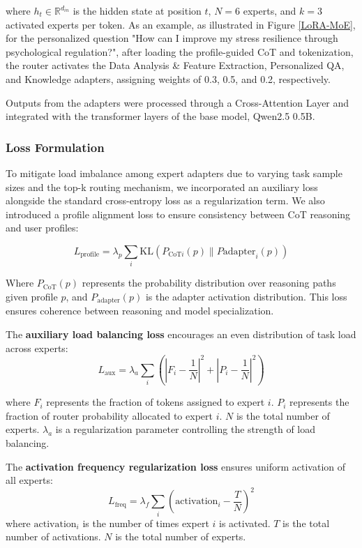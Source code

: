 \documentclass[preprint,12pt]{elsarticle}
\begin{document}
\noindent where $h_t \in \mathbb{R}^{d_{in}}$ is the hidden state at position $t$, $N = 6$ experts, and $k = 3$ activated experts per token. As an example, as illustrated in Figure \ref{LoRA-MoE}, for the personalized question "How can I improve my stress resilience through psychological regulation?", after loading the profile-guided CoT and tokenization, the router activates the Data Analysis \& Feature Extraction, Personalized QA, and Knowledge adapters, assigning weights of 0.3, 0.5, and 0.2, respectively.

Outputs from the adapters were processed through a Cross-Attention Layer and integrated with the transformer layers of the base model, Qwen2.5 0.5B.

\subsubsection{Loss Formulation}
To mitigate load imbalance among expert adapters due to varying task sample sizes and the top-k routing mechanism, we incorporated an auxiliary loss alongside the standard cross-entropy loss as a regularization term. We also introduced a profile alignment loss to ensure consistency between CoT reasoning and user profiles:

\begin{equation}
L_{\text{profile}} = \lambda_p \sum_{i} \text{KL}(P_{\text{CoT}i}(p) \parallel P{\text{adapter}_i}(p))
\end{equation}

Where $P_{\text{CoT}}(p)$ represents the probability distribution over reasoning paths given profile $p$, and $P_{\text{adapter}}(p)$ is the adapter activation distribution. This loss ensures coherence between reasoning and model specialization.

The \textbf{auxiliary load balancing loss} encourages an even distribution of task load across experts:
\begin{equation}
L_{\text{aux}} = \lambda_a \sum_{i} \left( \left| F_i - \frac{1}{N} \right|^2 + \left| P_i - \frac{1}{N} \right|^2 \right)
\end{equation}

where $F_i$ represents the fraction of tokens assigned to expert $i$. $P_i$ represents the fraction of router probability allocated to expert $i$. $N$ is the total number of experts. $\lambda_a$ is a regularization parameter controlling the strength of load balancing.

The \textbf{activation frequency regularization loss} ensures uniform activation of all experts:
\begin{equation}
L_{\text{freq}} = \lambda_f \sum_{i} \left( \text{activation}_i - \frac{T}{N} \right)^2
\end{equation}
where $\text{activation}_i$ is the number of times expert $i$ is activated. $T$ is the total number of activations. $N$ is the total number of experts.
\end{document}
